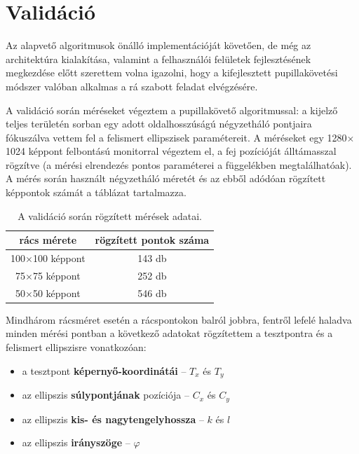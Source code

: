 \section{Validáció}\label{sect:validacio}

Az alapvető algoritmusok önálló implementációját követően, de még az architektúra kialakítása, valamint a felhasználói felületek fejlesztésének megkezdése előtt szerettem volna igazolni, hogy a kifejlesztett pupillakövetési módszer valóban alkalmas a rá szabott feladat elvégzésére.

A validáció során méréseket végeztem a pupillakövető algoritmussal: a kijelző teljes területén sorban egy adott oldalhosszúságú négyzetháló pontjaira fókuszálva vettem fel a felismert ellipszisek paramétereit. A méréseket egy 1280$\times$1024 képpont felbontású monitorral végeztem el, a fej pozícióját álltámasszal rögzítve (a mérési elrendezés pontos paraméterei a  függelékben megtalálhatóak). A mérés során használt négyzetháló méretét és az ebből adódóan rögzített képpontok számát a  táblázat tartalmazza.

\begin{table}[ht]
	\centering
	\caption{A validáció során rögzített mérések adatai.} \label{tab:meresi_pontok}
	\begin{tabular}{ c | c }
	rács mérete & rögzített pontok száma \\ \hline \hline
	100$\times$100 képpont & 143 db \\
	75$\times$75 képpont & 252 db \\
	50$\times$50 képpont & 546 db \\
	\end{tabular}
\end{table}

Mindhárom rácsméret esetén a rácspontokon balról jobbra, fentről lefelé haladva minden mérési pontban a következő adatokat rögzítettem a tesztpontra és a felismert ellipszisre vonatkozóan:

\begin{itemize}
  \item a tesztpont \textbf{képernyő-koordinátái} -- $T_x$ és $T_y$
  \item az ellipszis \textbf{súlypontjának} pozíciója -- $C_x$ és $C_y$
  \item az ellipszis \textbf{kis- és nagytengelyhossza} -- $k$ és $l$
  \item az ellipszis \textbf{irányszöge} -- $\varphi$
\end{itemize}

